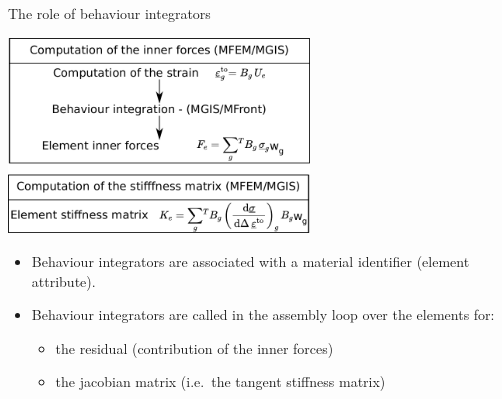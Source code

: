 \documentclass{beamer}
\begin{document}
\begin{frame}{The
    role of behaviour integrators}
  \begin{center}
    \includegraphics[width=0.6\textwidth]{img/behaviour-integrators.pdf}
  \end{center}
  \begin{itemize}
    \item Behaviour integrators are associated with a material
    identifier (element attribute).
    \item Behaviour integrators are called in the assembly loop
    over the elements for:
    \begin{itemize}
      \item the residual (contribution of the inner forces)
      \item the jacobian matrix (i.e.~the tangent stiffness
      matrix)
    \end{itemize}
  \end{itemize}
\end{frame}
\end{document}
